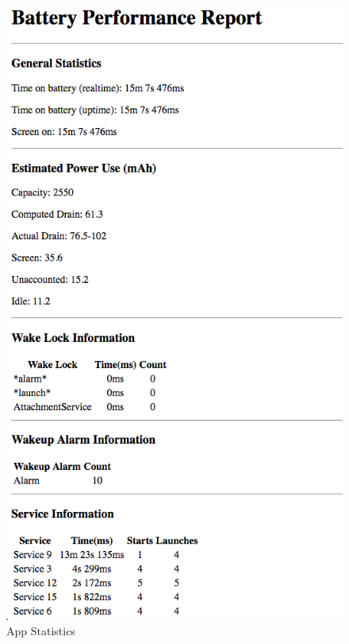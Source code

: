 \begin{figure}[!h]
 	\begin{center}
		\includegraphics[scale=0.6]{reporter1}
		\caption{App Statistics}
	\end{center}
\end{figure}

